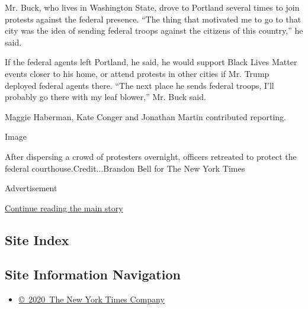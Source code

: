 Mr. Buck, who lives in Washington State, drove to Portland several times
to join protests against the federal presence. ``The thing that
motivated me to go to that city was the idea of sending federal troops
against the citizens of this country,'' he said.

If the federal agents left Portland, he said, he would support Black
Lives Matter events closer to his home, or attend protests in other
cities if Mr. Trump deployed federal agents there. ``The next place he
sends federal troops, I'll probably go there with my leaf blower,'' Mr.
Buck said.

Maggie Haberman, Kate Conger and Jonathan Martin contributed reporting.

Image

After dispersing a crowd of protesters overnight, officers retreated to
protect the federal courthouse.Credit...Brandon Bell for The New York
Times

Advertisement

\protect\hyperlink{after-bottom}{Continue reading the main story}

\hypertarget{site-index}{%
\subsection{Site Index}\label{site-index}}

\hypertarget{site-information-navigation}{%
\subsection{Site Information
Navigation}\label{site-information-navigation}}

\begin{itemize}
\tightlist
\item
  \href{https://help.nytimes.com/hc/en-us/articles/115014792127-Copyright-notice}{©~2020~The
  New York Times Company}
\end{itemize}

